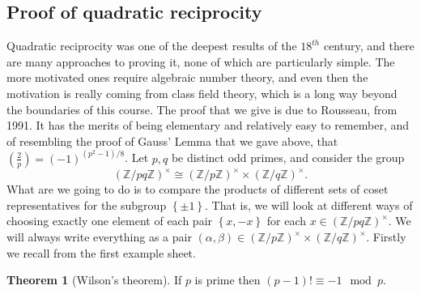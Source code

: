 \documentclass{article}
\newcommand{\Z}{\mathbb{Z}}
\newcommand{\rb}[1]{\left( #1 \right)}
\newcommand{\cb}[1]{\left\{ #1 \right\}}
\newcommand{\unit}[1]{\rb{\Z / #1\Z}^\times}
\newcommand{\legendre}[2]{\rb{\tfrac{#1}{#2}}}
\theoremstyle{definition}\newtheorem{definition}{Definition}
\theoremstyle{definition}\newtheorem*{remark}{Remark}
\theoremstyle{definition}\newtheorem*{example}{Example}
\theoremstyle{definition}\newtheorem*{note}{Note}
\newtheorem{theorem}[definition]{Theorem}
\begin{document}

\subsection{Proof of quadratic reciprocity}

Quadratic reciprocity was one of the deepest results of the $ 18^{th} $ century, and there are many approaches to proving it, none of which are particularly simple. The more motivated ones require algebraic number theory, and even then the motivation is really coming from class field theory, which is a long way beyond the boundaries of this course. The proof that we give is due to Rousseau, from 1991. It has the merits of being elementary and relatively easy to remember, and of resembling the proof of Gauss' Lemma that we gave above, that $ \legendre{2}{p} = \rb{-1}^{\rb{p^2 - 1} / 8} $. Let $ p, q $ be distinct odd primes, and consider the group
$$ \unit{pq} \cong \unit{p} \times \unit{q}. $$
What are we going to do is to compare the products of different sets of coset representatives for the subgroup $ \cb{\pm 1} $. That is, we will look at different ways of choosing exactly one element of each pair $ \cb{x, -x} $ for each $ x \in \unit{pq} $. We will always write everything as a pair $ \rb{\alpha, \beta} \in \unit{p} \times \unit{q} $. Firstly we recall from the first example sheet.

\begin{theorem}[Wilson's theorem]
If $ p $ is prime then $ \rb{p - 1}! \equiv -1 \mod p $.
\end{theorem}
\end{document}
